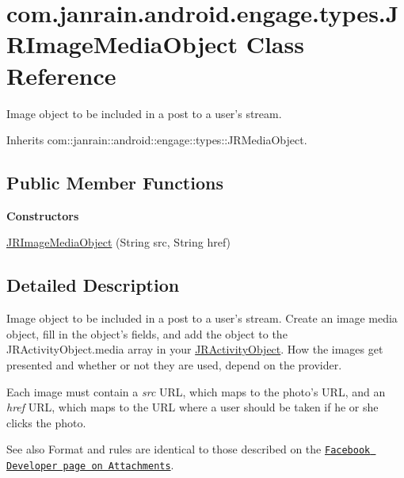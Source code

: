 \hypertarget{classcom_1_1janrain_1_1android_1_1engage_1_1types_1_1_j_r_image_media_object}{
\section{com.janrain.android.engage.types.JRImageMediaObject Class Reference}
\label{classcom_1_1janrain_1_1android_1_1engage_1_1types_1_1_j_r_image_media_object}
}


Image object to be included in a post to a user's stream.  




Inherits com::janrain::android::engage::types::JRMediaObject.

\subsection*{Public Member Functions}
\begin{Indent}{\bf Constructors}\par
{\em \label{_amgrp559a25fdb98a7d1fd1c3771ac568d5e9}
 }\begin{DoxyCompactItemize}
\item 
\hyperlink{classcom_1_1janrain_1_1android_1_1engage_1_1types_1_1_j_r_image_media_object_a14ad49a8b8a77ef12ed459b685cbac07}{JRImageMediaObject} (String src, String href)
\end{DoxyCompactItemize}
\end{Indent}


\subsection{Detailed Description}
Image object to be included in a post to a user's stream. Create an image media object, fill in the object's fields, and add the object to the JRActivityObject.media array in your \hyperlink{classcom_1_1janrain_1_1android_1_1engage_1_1types_1_1_j_r_activity_object}{JRActivityObject}. How the images get presented and whether or not they are used, depend on the provider.

Each image must contain a {\itshape src\/} URL, which maps to the photo's URL, and an {\itshape href\/} URL, which maps to the URL where a user should be taken if he or she clicks the photo.

\begin{DoxySeeAlso}{See also}
Format and rules are identical to those described on the \href{http://developers.facebook.com/docs/guides/attachments}{\tt Facebook Developer page on Attachments}. 
\end{DoxySeeAlso}


